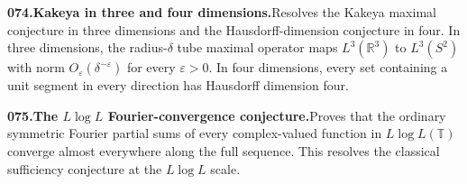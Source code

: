\documentclass[11pt,a4paper]{article}
\begin{document}
  \par \begin{minipage}{\linewidth}
  \fontsize{10.5}{12.6}\selectfont\RaggedRight
  \hypertarget{result 074}{}
  {\bfseries\textcolor{muted}{074.}\enspace Kakeya in three and four dimensions.}\enspace Resolves the Kakeya maximal conjecture in three dimensions and the Hausdorff-dimension conjecture in four. In three dimensions, the radius-$\delta$ tube maximal operator maps $L^3(\mathbb R^3)$ to $L^3(S^2)$ with norm $O_\varepsilon(\delta^{-\varepsilon})$ for every $\varepsilon>0$. In four dimensions, every set containing a unit segment in every direction has Hausdorff dimension four.\par
  \end{minipage}\par\vspace{5pt}



  \par \begin{minipage}{\linewidth}
  \fontsize{10.5}{12.6}\selectfont\RaggedRight
  \hypertarget{result 075}{}
  {\bfseries\textcolor{muted}{075.}\enspace The $L\log L$ Fourier-convergence conjecture.}\enspace Proves that the ordinary symmetric Fourier partial sums of every complex-valued function in $L\log L(\mathbb T)$ converge almost everywhere along the full sequence. This resolves the classical sufficiency conjecture at the $L\log L$ scale.\par
  \end{minipage}\par\vspace{5pt}
\end{document}

